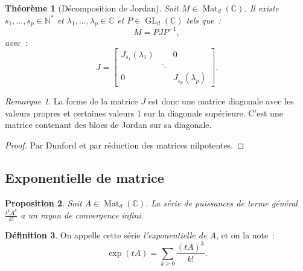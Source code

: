 \documentclass{report}
\newtheorem{thm}{Théorème}[chapter]
\newtheorem{prp}[thm]{Proposition}
\theoremstyle{definition}
\newtheorem{déf}[thm]{Définition}
\theoremstyle{remark}
\newtheorem*{rmq}{Remarque}
\numberwithin{equation}{section}
\newcommand{\C}{\mathbb C}
\newcommand{\N}{\mathbb N}
\newcommand{\Ns}{\N^{*}}
\DeclareMathOperator{\Mat}{Mat}
\DeclareMathOperator{\GL}{GL}
\begin{document}
			\begin{thm}[Décomposition de Jordan] Soit $M \in \Mat_d(\C)$. Il existe $s_1, \ldots, s_p \in \Ns$ et $\lambda_1, \ldots, \lambda_p \in \C$
			et $P \in \GL_d(\C)$ tels que~:
			\begin{equation}
				M = PJP^{-1},
			\end{equation}
			avec~:
			\begin{equation}
				J =
				\begin{bmatrix}
					J_{s_1}(\lambda_1) & & 0 \\
					& \ddots & \\
					0 & & J_{s_p}(\lambda_p)
				\end{bmatrix}.
			\end{equation}
			\end{thm}

			\begin{rmq} La forme de la matrice $J$ est donc une matrice diagonale avec les valeurs propres et certaines valeurs 1 sur la diagonale supérieure.
			C'est une matrice contenant des blocs de Jordan sur sa diagonale.
			\end{rmq}

			\begin{proof} Par Dunford et par réduction des matrices nilpotentes.
			\end{proof}

		\subsection{Exponentielle de matrice}
			\begin{prp} Soit $A \in \Mat_d(\C)$. La série de puissances de terme général $\frac {t^kA^k}{k!}$ a un rayon de convergence infini.
			\end{prp}

			\begin{déf} On appelle cette série \textit{l'exponentielle de $A$}, et on la note~:
			\begin{equation}
				\exp\left(tA\right) = \sum_{k \geq 0}\frac {(tA)^k}{k!}.
			\end{equation}
			\end{déf}
\end{document}
